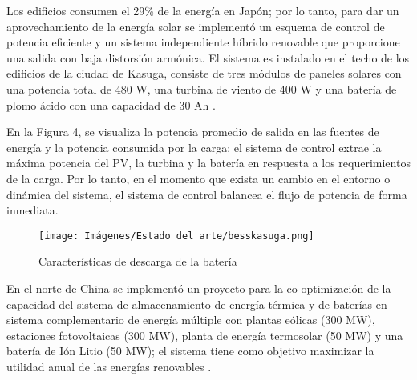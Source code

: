 \newline
Los edificios consumen el 29\% de la energía en Japón; por lo tanto, para dar un aprovechamiento de la energía solar se implementó un esquema de control de potencia eficiente y un sistema independiente híbrido renovable que proporcione una salida con baja distorsión armónica. El sistema es instalado en el techo de los edificios de la ciudad de Kasuga, consiste de tres módulos de paneles solares con una potencia total de 480 W, una turbina de viento de 400 W y una batería de plomo ácido con una capacidad de 30 Ah \cite{BESS_KASUGA_JAPON}.

En la Figura 4, se visualiza la potencia promedio de salida en las fuentes de energía y la potencia consumida por la carga; el sistema de control extrae la máxima potencia del PV, la turbina y la batería en respuesta a los requerimientos de la carga. Por lo tanto, en el momento que exista un cambio en el entorno o dinámica del sistema, el sistema de control balancea el flujo de potencia de forma inmediata. 
\begin{figure}[h!]
    \begin{center}
    \centering
\texttt{[image: Imágenes/Estado del arte/besskasuga.png]}
	\caption{ Características de descarga de la batería \cite{BESS_KASUGA_JAPON}}
    \end{center}
\end{figure}

En el norte de China se implementó un proyecto para  la co-optimización de  la capacidad del sistema de almacenamiento de energía térmica y de baterías en sistema complementario de energía múltiple con plantas eólicas (300 MW), estaciones fotovoltaicas (300 MW), planta de energía termosolar (50 MW) y una batería de Ión Litio (50 MW); el sistema tiene como objetivo maximizar la utilidad anual de las energías renovables \cite{li2019capacity}.

